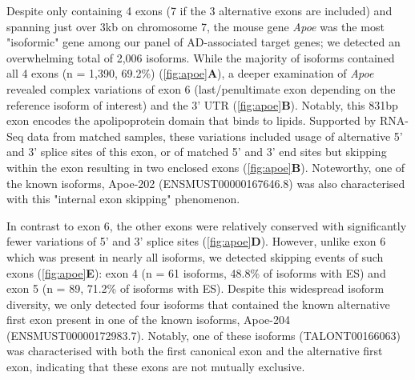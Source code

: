 Despite only containing 4 exons (7 if the 3 alternative exons are included) and spanning just over 3kb on chromosome 7, the mouse gene \textit{Apoe} was the most "isoformic" gene among our panel of AD-associated target genes; we detected an overwhelming total of 2,006 isoforms. While the majority of isoforms contained all 4 exons (n = 1,390, 69.2\%) (\cref{fig:apoe}\textbf{A}), a deeper examination of \textit{Apoe} revealed complex variations of exon 6 (last/penultimate exon depending on the reference isoform of interest) and the 3' UTR (\cref{fig:apoe}\textbf{B}). Notably, this 831bp exon encodes the apolipoprotein domain that binds to lipids.  Supported by RNA-Seq data from matched samples, these variations included usage of alternative 5' and 3' splice sites of this exon, or of matched 5' and 3' end sites but skipping within the exon resulting in two enclosed exons (\cref{fig:apoe}\textbf{B}). Noteworthy, one of the known isoforms, Apoe-202 (ENSMUST00000167646.8) was also characterised with this "internal exon skipping" phenomenon.

In contrast to exon 6, the other exons were relatively conserved with significantly fewer variations of 5' and 3' splice sites (\cref{fig:apoe}\textbf{D}). However, unlike exon 6 which was present in nearly all isoforms, we detected skipping events of such exons (\cref{fig:apoe}\textbf{E}): exon 4 (n = 61 isoforms, 48.8\% of isoforms with ES) and exon 5 (n = 89, 71.2\% of isoforms with ES). Despite this widespread isoform diversity, we only detected four isoforms that contained the known alternative first exon present in one of the known isoforms, Apoe-204 (ENSMUST00000172983.7). Notably, one of these isoforms (TALONT00166063) was characterised with both the first canonical exon and the alternative first exon, indicating that these exons are not mutually exclusive. 

